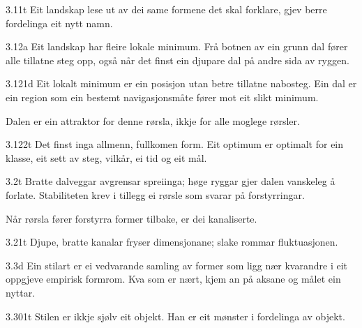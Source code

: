 \begin{formproposition}{3.11}{t}
Eit landskap lese ut av dei same formene det skal forklare, gjev berre fordelinga eit nytt namn.
\end{formproposition}

\begin{formproposition}{3.12}{a}
Eit landskap har fleire lokale minimum. Frå botnen av ein grunn dal fører alle tillatne steg opp, også når det finst ein djupare dal på andre sida av ryggen.
\end{formproposition}

\begin{formproposition}{3.121}{d}
Eit lokalt minimum er ein posisjon utan betre tillatne nabosteg. Ein dal er ein region som ein bestemt navigasjonsmåte fører mot eit slikt minimum.

Dalen er ein attraktor for denne rørsla, ikkje for alle moglege rørsler.
\end{formproposition}

\begin{formproposition}{3.122}{t}
Det finst inga allmenn, fullkomen form. Eit optimum er optimalt for ein klasse, eit sett av steg, vilkår, ei tid og eit mål.
\end{formproposition}

\begin{formproposition}{3.2}{t}
Bratte dalveggar avgrensar spreiinga; høge ryggar gjer dalen vanskeleg å forlate. Stabiliteten krev i tillegg ei rørsle som svarar på forstyrringar.

Når rørsla fører forstyrra former tilbake, er dei kanaliserte.
\end{formproposition}

\begin{formproposition}{3.21}{t}
Djupe, bratte kanalar fryser dimensjonane; slake rommar fluktuasjonen.
\end{formproposition}

\begin{formproposition}{3.3}{d}
Ein stilart er ei vedvarande samling av former som ligg nær kvarandre i eit oppgjeve empirisk formrom. Kva som er nært, kjem an på aksane og målet ein nyttar.
\end{formproposition}

\begin{formproposition}{3.301}{t}
Stilen er ikkje sjølv eit objekt. Han er eit mønster i fordelinga av objekt.
\end{formproposition}

